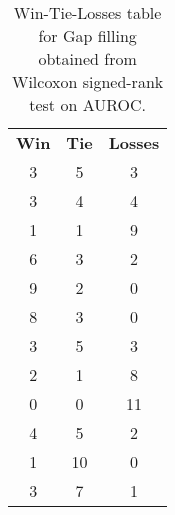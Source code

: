 \begin{table}
\centering
\caption{Win-Tie-Losses table for Gap filling obtained from Wilcoxon signed-rank test on AUROC.}
\label{tab:gap_filling_model_comparison_AUROC}
\begin{tabular}{|c|c|c|}
\toprule
 \textbf{Win} &  \textbf{Tie} &  \textbf{Losses} \\
            3 &             5 &                3 \\
\midrule
            3 &             4 &                4 \\
            1 &             1 &                9 \\
            6 &             3 &                2 \\
            9 &             2 &                0 \\
            8 &             3 &                0 \\
            3 &             5 &                3 \\
            2 &             1 &                8 \\
            0 &             0 &               11 \\
            4 &             5 &                2 \\
            1 &            10 &                0 \\
            3 &             7 &                1 \\
\bottomrule
\end{tabular}
\end{table}
